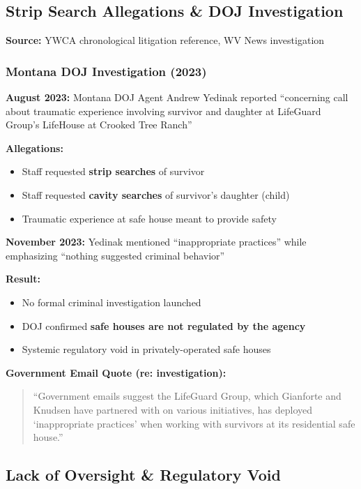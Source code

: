 \documentclass[11pt,letterpaper]{article}
\newenvironment{testimony}{%
    \begin{quote}\itshape\color{DarkGray}%
}{%
    \end{quote}%
}
\begin{document}
\subsection{Strip Search Allegations \& DOJ Investigation}

\textbf{Source:} YWCA chronological litigation reference, WV News investigation

\subsubsection{Montana DOJ Investigation (2023)}

\textbf{August 2023:}
Montana DOJ Agent Andrew Yedinak reported ``concerning call about traumatic experience involving survivor and daughter at LifeGuard Group's LifeHouse at Crooked Tree Ranch''

\textbf{Allegations:}
\begin{itemize}[leftmargin=*]
\item Staff requested \textbf{strip searches} of survivor
\item Staff requested \textbf{cavity searches} of survivor's daughter (child)
\item Traumatic experience at safe house meant to provide safety
\end{itemize}

\textbf{November 2023:}
Yedinak mentioned ``inappropriate practices'' while emphasizing ``nothing suggested criminal behavior''

\textbf{Result:}
\begin{itemize}[leftmargin=*]
\item No formal criminal investigation launched
\item DOJ confirmed \textbf{safe houses are not regulated by the agency}
\item Systemic regulatory void in privately-operated safe houses
\end{itemize}

\textbf{Government Email Quote (re: investigation):}
\begin{testimony}
``Government emails suggest the LifeGuard Group, which Gianforte and Knudsen have partnered with on various initiatives, has deployed `inappropriate practices' when working with survivors at its residential safe house.''
\end{testimony}

\subsection{Lack of Oversight \& Regulatory Void}
\end{document}
